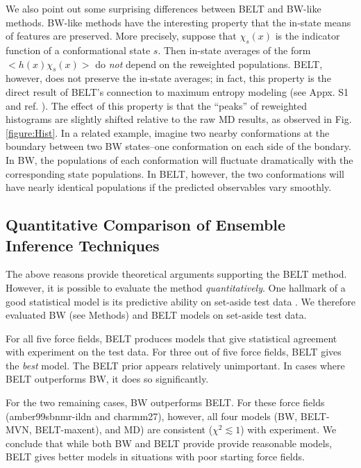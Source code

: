 \documentclass[11pt,titlepage]{article}
\begin{document}
We also point out some surprising differences between BELT and BW-like methods.  BW-like methods have the interesting property that the in-state means of features are preserved.  More precisely, suppose that $\chi_s(x)$ is the indicator function of a conformational state $s$.  Then in-state averages of the form $<h(x) \chi_s(x)>$ do \emph{not} depend on the reweighted populations.  BELT, however, does not preserve the in-state averages; in fact, this property is the direct result of BELT's connection to maximum entropy modeling (see Appx. S1 and ref. \citep{chodera2012}).  The effect of this property is that the ``peaks'' of reweighted histograms are slightly shifted relative to the raw MD results, as observed in Fig. \ref{figure:Hist}.  In a related example, imagine two nearby conformations at the boundary between two BW states--one conformation on each side of the bondary.  In BW, the populations of each conformation will fluctuate dramatically with the corresponding state populations.  In BELT, however, the two conformations will have nearly identical populations if the predicted observables vary smoothly. 

\subsection*{Quantitative Comparison of Ensemble Inference Techniques}

The above reasons provide theoretical arguments supporting the BELT method.  However, it is possible to evaluate the method \emph{quantitatively}.  One hallmark of a good statistical model is its predictive ability on set-aside test data \citep{friedman2001elements}.  We therefore evaluated BW (see Methods) and BELT models on set-aside test data.  

For all five force fields, BELT produces models that give statistical agreement with experiment on the test data.  For three out of five force fields, BELT gives the \emph{best} model.  The BELT prior appears relatively unimportant.  In cases where BELT outperforms BW, it does so significantly.  

For the two remaining cases, BW outperforms BELT.  For these force fields (amber99sbnmr-ildn and charmm27), however, all four models (BW, BELT-MVN, BELT-maxent), and MD) are consistent ($\chi^2 \lesssim 1$) with experiment.  We conclude that while both BW and BELT provide provide reasonable models, BELT gives better models in situations with poor starting force fields.  

\vspace{5mm}
\end{document}
